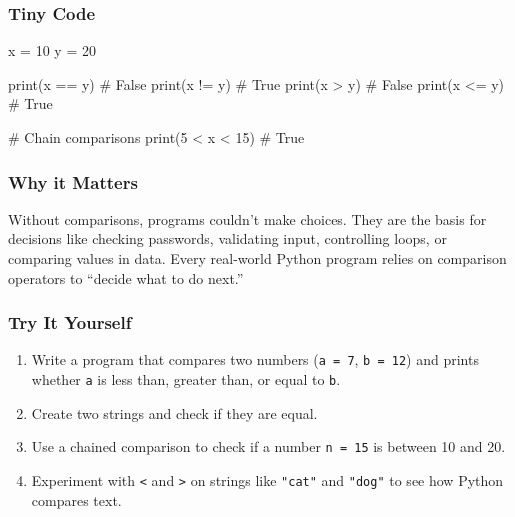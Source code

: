 \documentclass[
  letterpaper,
  DIV=11,
  numbers=noendperiod]{scrreprt}
\newenvironment{Shaded}{\begin{snugshade}}{\end{snugshade}}
\newcommand{\BuiltInTok}[1]{\textcolor[rgb]{0.00,0.23,0.31}{#1}}
\newcommand{\CommentTok}[1]{\textcolor[rgb]{0.37,0.37,0.37}{#1}}
\newcommand{\DecValTok}[1]{\textcolor[rgb]{0.68,0.00,0.00}{#1}}
\newcommand{\NormalTok}[1]{\textcolor[rgb]{0.00,0.23,0.31}{#1}}
\newcommand{\OperatorTok}[1]{\textcolor[rgb]{0.37,0.37,0.37}{#1}}
\providecommand{\tightlist}{%
  \setlength{\itemsep}{0pt}\setlength{\parskip}{0pt}}
\begin{document}
\subsubsection{Tiny Code}\label{tiny-code-11}

\begin{Shaded}
\begin{Highlighting}[]
\NormalTok{x }\OperatorTok{=} \DecValTok{10}
\NormalTok{y }\OperatorTok{=} \DecValTok{20}

\BuiltInTok{print}\NormalTok{(x }\OperatorTok{==}\NormalTok{ y)   }\CommentTok{\# False}
\BuiltInTok{print}\NormalTok{(x }\OperatorTok{!=}\NormalTok{ y)   }\CommentTok{\# True}
\BuiltInTok{print}\NormalTok{(x }\OperatorTok{\textgreater{}}\NormalTok{ y)    }\CommentTok{\# False}
\BuiltInTok{print}\NormalTok{(x }\OperatorTok{\textless{}=}\NormalTok{ y)   }\CommentTok{\# True}

\CommentTok{\# Chain comparisons}
\BuiltInTok{print}\NormalTok{(}\DecValTok{5} \OperatorTok{\textless{}}\NormalTok{ x }\OperatorTok{\textless{}} \DecValTok{15}\NormalTok{)  }\CommentTok{\# True}
\end{Highlighting}
\end{Shaded}

\subsubsection{Why it Matters}\label{why-it-matters-11}

Without comparisons, programs couldn't make choices. They are the basis
for decisions like checking passwords, validating input, controlling
loops, or comparing values in data. Every real-world Python program
relies on comparison operators to ``decide what to do next.''

\subsubsection{Try It Yourself}\label{try-it-yourself-11}

\begin{enumerate}
\def\labelenumi{\arabic{enumi}.}
\tightlist
\item
  Write a program that compares two numbers (\texttt{a\ =\ 7},
  \texttt{b\ =\ 12}) and prints whether \texttt{a} is less than, greater
  than, or equal to \texttt{b}.
\item
  Create two strings and check if they are equal.
\item
  Use a chained comparison to check if a number \texttt{n\ =\ 15} is
  between 10 and 20.
\item
  Experiment with \texttt{\textless{}} and \texttt{\textgreater{}} on
  strings like \texttt{"cat"} and \texttt{"dog"} to see how Python
  compares text.
\end{enumerate}
\end{document}
